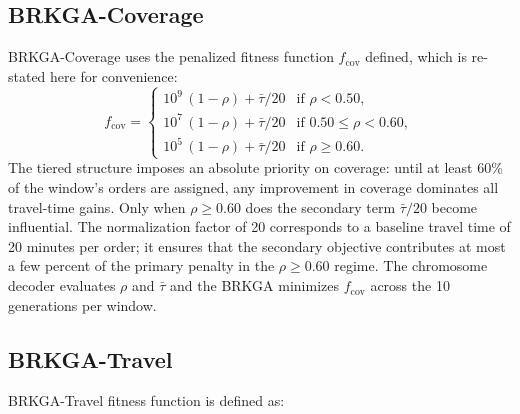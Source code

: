 \documentclass[runningheads]{llncs}
\begin{document}
\subsection{BRKGA-Coverage}
\label{subsec:brkga_cov}
{\small
BRKGA-Coverage uses the penalized fitness function $f_{\text{cov}}$
defined, which is re-stated here for convenience:
\vspace{-6pt}
\begin{equation*}
    f_{\text{cov}} =
    \begin{cases}
        10^{9}\,(1 - \rho) + \bar{\tau}/20 & \text{if } \rho < 0.50, \\
        10^{7}\,(1 - \rho) + \bar{\tau}/20 & \text{if } 0.50 \leq \rho < 0.60, \\
        10^{5}\,(1 - \rho) + \bar{\tau}/20 & \text{if } \rho \geq 0.60.
    \end{cases}
\end{equation*}
}
The tiered structure imposes an absolute priority on coverage: until at least 60\% of the window's orders are assigned, any improvement in coverage dominates all travel-time gains. Only when $\rho \geq 0.60$ does the secondary term $\bar{\tau}/20$
become influential. The normalization factor of 20 corresponds to a baseline travel
time of 20 minutes per order; it ensures that the secondary objective contributes at most a few percent of the primary penalty in the $\rho \geq 0.60$ regime. The chromosome decoder evaluates $\rho$ and $\bar{\tau}$ and the BRKGA minimizes $f_{\text{cov}}$ across the 10 generations per window.



\subsection{BRKGA-Travel}
\label{subsec:brkga_trav}

BRKGA-Travel fitness function is defined as:
\vspace{-6pt}
\end{document}
